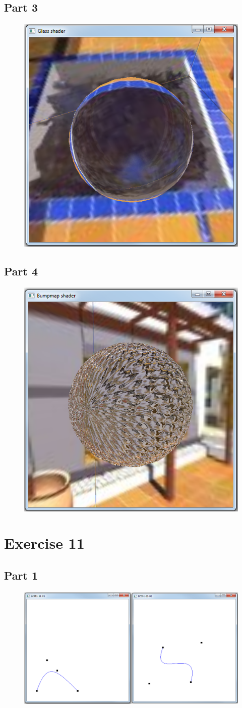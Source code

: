 \documentclass[11pt]{article}
\begin{document}
\subsection{Part 3}
\begin{figure}[H]
	\centering
	\includegraphics[width=0.5\linewidth]{images/e10p3}
	\label{fig:e10p3}
\end{figure}

\subsection{Part 4}
\begin{figure}[H]
	\centering
	\includegraphics[width=0.5\linewidth]{images/e10p4}
	\label{fig:e10p4}
\end{figure}


\section{Exercise 11}
\subsection{Part 1}
\begin{figure}[H]
	\centering
	\includegraphics[width=0.5\linewidth]{images/e11p1}
	\label{fig:e11p1}
\end{figure}
\end{document}
